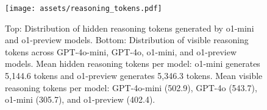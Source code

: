 
\begin{figure}[h]
    \centering
    \texttt{[image: assets/reasoning\_tokens.pdf]}
    \vspace{-0.7cm}
    \caption{
    Top: Distribution of hidden reasoning tokens generated by o1-mini and o1-preview models.
    Bottom: Distribution of visible reasoning tokens across GPT-4o-mini, GPT-4o, o1-mini, and o1-preview models.
    Mean hidden reasoning tokens per model: o1-mini generates 5,144.6 tokens and o1-preview generates 5,346.3 tokens.
    Mean visible reasoning tokens per model: GPT-4o-mini (502.9), GPT-4o (543.7), o1-mini (305.7), and o1-preview (402.4).
    }
    \label{fig:o1_hidden_cot}
\end{figure}


